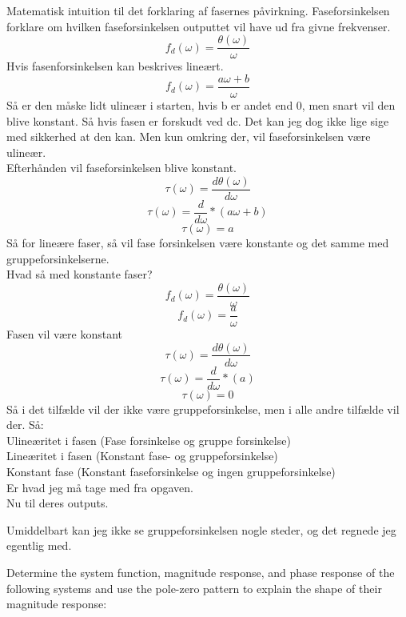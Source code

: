 \begin{Opgaver}
\begin{kapitel}
\begin{Opgave}
            Matematisk intuition til det forklaring af fasernes påvirkning.
            Faseforsinkelsen forklare om hvilken faseforsinkelsen outputtet vil have ud fra givne frekvenser.
            \[f_d(\omega) = \frac{\theta(\omega)}{\omega}\]
            Hvis fasenforsinkelsen kan beskrives lineært. 
            \[f_d(\omega) = \frac{a\omega + b}{\omega}\]
            Så er den måske lidt ulineær i starten, hvis b er andet end 0, men snart vil den blive konstant. 
            Så hvis fasen er forskudt ved dc. Det kan jeg dog ikke lige sige med sikkerhed at den kan. Men kun omkring der, vil faseforsinkelsen være ulineær.\\
            Efterhånden vil faseforsinkelsen blive konstant. \\
            \[\tau(\omega) = \frac{d\theta(\omega)}{d\omega}\]
            \[\tau(\omega) = \frac{d}{d\omega} * (a\omega + b)\]
            \[\tau(\omega) = a\]
            Så for lineære faser, så vil fase forsinkelsen være konstante og det samme med gruppeforsinkelserne.\\
            Hvad så med konstante faser? 
            \[f_d(\omega) = \frac{\theta(\omega)}{\omega}\]
            \[f_d(\omega) = \frac{a}{\omega}\]
            Fasen vil være konstant
            \[\tau(\omega) = \frac{d\theta(\omega)}{d\omega}\]
            \[\tau(\omega) = \frac{d}{d\omega} * (a)\]
            \[\tau(\omega) = 0\]
            Så i det tilfælde vil der ikke være gruppeforsinkelse, men i alle andre tilfælde vil der. Så: \\
            Ulineæritet i fasen (Fase forsinkelse og gruppe forsinkelse)\\
            Lineæritet i fasen (Konstant fase- og gruppeforsinkelse)\\
            Konstant fase       (Konstant faseforsinkelse og ingen gruppeforsinkelse)\\
            Er hvad jeg må tage med fra opgaven. \\ Nu til deres outputs. \\
            \vspace{160pt}
        
            Umiddelbart kan jeg ikke se gruppeforsinkelsen nogle steder, og det regnede jeg egentlig med.
            
        \end{Opgave}
        \begin{Opgave}
            Determine the system function, magnitude response, and phase response of the following 
            systems and use the pole-zero pattern to explain the shape of their magnitude response:
            \begin{UnderOpgave}[\text{$y[n] = x[n] - x[n - 2] - 0.81y[n - 2]$}]
    

\end{UnderOpgave}
\end{Opgave}
\end{kapitel}
\end{Opgaver}
